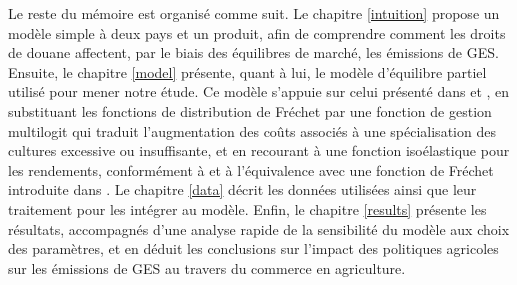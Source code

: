 Le reste du mémoire est organisé comme suit. Le chapitre \ref{intuition} propose un modèle simple à deux pays et un produit, afin de comprendre comment les droits de douane affectent, par le biais des équilibres de marché, les émissions de GES. Ensuite, le chapitre \ref{model} présente, quant à lui, le modèle d’équilibre partiel utilisé pour mener notre étude. Ce modèle s’appuie sur celui présenté dans \cite{Gouel2021} et \cite{Gouel2025}, en substituant les fonctions de distribution de Fréchet par une fonction de gestion multilogit qui traduit l’augmentation des coûts associés à une spécialisation des cultures excessive ou insuffisante, et en recourant à une fonction isoélastique pour les rendements, conformément à \cite{Carpentier2013} et à l’équivalence avec une fonction de Fréchet introduite dans \cite{Gouel202x}. Le chapitre \ref{data} décrit les données utilisées ainsi que leur traitement pour les intégrer au modèle. Enfin, le chapitre \ref{results} présente les résultats, accompagnés d’une analyse rapide de la sensibilité du modèle aux choix des paramètres, et en déduit les conclusions sur l’impact des politiques agricoles sur les émissions de GES au travers du commerce en agriculture.

